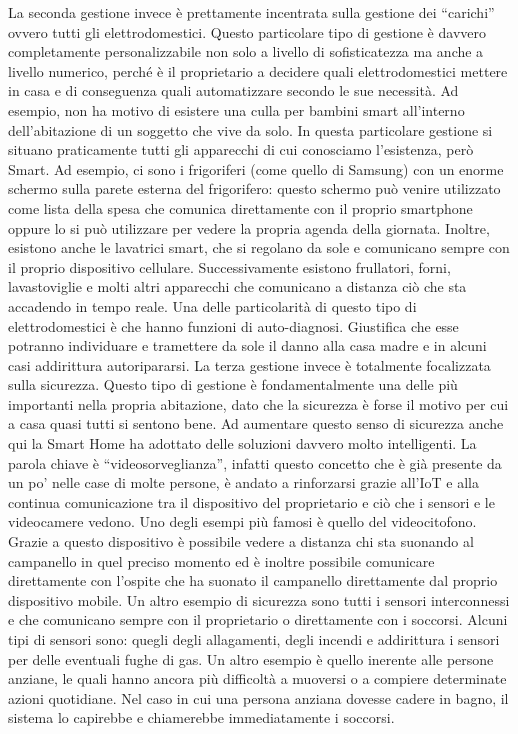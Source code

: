 La seconda gestione invece è prettamente incentrata sulla gestione dei “carichi” ovvero tutti gli elettrodomestici. Questo particolare tipo di gestione è davvero completamente personalizzabile non solo a livello di sofisticatezza ma anche a livello numerico, perché è il proprietario a decidere quali elettrodomestici mettere in casa e di conseguenza quali automatizzare secondo le sue necessità. Ad esempio, non ha motivo di esistere una culla per bambini smart all’interno dell’abitazione di un soggetto che vive da solo. 
In questa particolare gestione si situano praticamente tutti gli apparecchi di cui conosciamo l’esistenza, però Smart. 
Ad esempio, ci sono i frigoriferi (come quello di Samsung) con un enorme schermo sulla parete esterna del frigorifero: questo schermo può venire utilizzato come lista della spesa che comunica direttamente con il proprio smartphone oppure lo si può utilizzare per vedere la propria agenda della giornata. Inoltre, esistono anche le lavatrici smart, che si regolano da sole e comunicano sempre con il proprio dispositivo cellulare. Successivamente esistono frullatori, forni, lavastoviglie e molti altri apparecchi che comunicano a distanza ciò che sta accadendo in tempo reale. Una delle particolarità di questo tipo di elettrodomestici è che hanno funzioni di auto-diagnosi. Giustifica che esse potranno individuare e tramettere da sole il danno alla casa madre e in alcuni casi addirittura autoripararsi. 
La terza gestione invece è totalmente focalizzata sulla sicurezza. Questo tipo di gestione è fondamentalmente una delle più importanti nella propria abitazione, dato che la sicurezza è forse il motivo per cui a casa quasi tutti si sentono bene. Ad aumentare questo senso di sicurezza anche qui la Smart Home  ha adottato delle soluzioni davvero molto intelligenti. La parola chiave è “videosorveglianza”, infatti questo concetto che è già presente da un po’ nelle case di molte persone, è andato a rinforzarsi grazie all’IoT e alla continua comunicazione tra il dispositivo del proprietario e ciò che i sensori e le videocamere vedono. 
Uno degli esempi più famosi è quello del videocitofono. Grazie a questo dispositivo è possibile vedere a distanza chi sta suonando al campanello in quel preciso momento ed è inoltre possibile comunicare direttamente con l’ospite che ha suonato il campanello direttamente dal proprio dispositivo mobile. 
Un altro esempio di sicurezza sono tutti i sensori interconnessi e che comunicano sempre con il proprietario o direttamente con i soccorsi. Alcuni tipi di sensori sono: quegli degli allagamenti, degli incendi e addirittura i sensori per delle eventuali fughe di gas. Un altro esempio è quello inerente alle persone anziane, le quali hanno ancora più difficoltà a muoversi o a compiere determinate azioni quotidiane. Nel caso in cui una persona anziana dovesse cadere in bagno, il sistema lo capirebbe e chiamerebbe immediatamente i soccorsi. 

